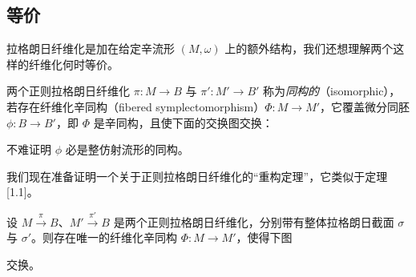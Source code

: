 
\subsection{等价}

拉格朗日纤维化是加在给定辛流形 $(M,\omega)$ 上的额外结构，我们还想理解两个这样的纤维化何时等价。

\begin{definition*}
两个正则拉格朗日纤维化 $\pi\colon M\to B$ 与 $\pi'\colon M'\to B'$ 称为\emph{同构的}（isomorphic），若存在纤维化辛同构（fibered symplectomorphism）$\Phi\colon M\to M'$，它覆盖微分同胚 $\phi\colon B\to B'$，即 $\Phi$ 是辛同构，且使下面的交换图交换：

\end{definition*}


\begin{exercise*}
不难证明 $\phi$ 必是整仿射流形的同构。
\end{exercise*}


我们现在准备证明一个关于正则拉格朗日纤维化的“重构定理”，它类似于定理 [1.1]。

\begin{theorem*}
设 $M\xrightarrow{\pi} B$、$M'\xrightarrow{\pi'} B$ 是两个正则拉格朗日纤维化，分别带有整体拉格朗日截面 $\sigma$ 与 $\sigma'$。则存在唯一的纤维化辛同构 $\Phi\colon M\to M'$，使得下图


交换。
\end{theorem*}


